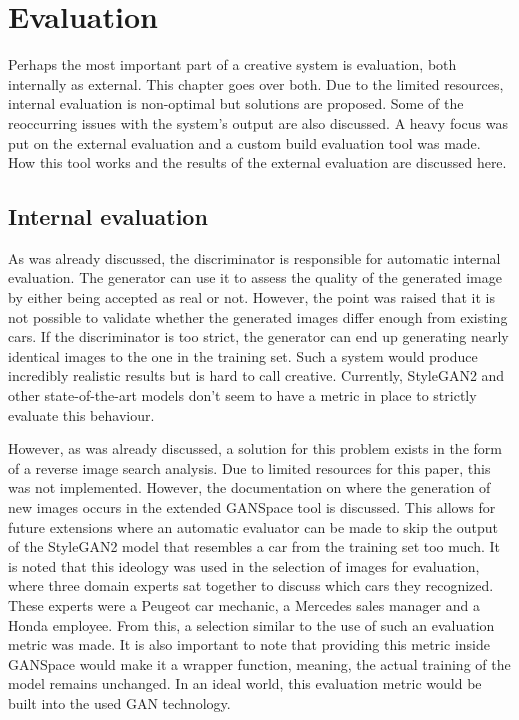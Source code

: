 \chapter{Evaluation}
\label{ch:evaluation}


Perhaps the most important part of a creative system is evaluation, both internally as external.
This chapter goes over both.
Due to the limited resources, internal evaluation is non-optimal but solutions are proposed.
Some of the reoccurring issues with the system's output are also discussed.
A heavy focus was put on the external evaluation and a custom build evaluation tool was made.
How this tool works and the results of the external evaluation are discussed here.

\section{Internal evaluation}
\label{sec:internal_evaluation}

As was already discussed, the discriminator is responsible for automatic internal evaluation.
The generator can use it to assess the quality of the generated image by either being accepted as real or not.
However, the point was raised that it is not possible to validate whether the generated images differ enough from existing cars.
If the discriminator is too strict, the generator can end up generating nearly identical images to the one in the training set.
Such a system would produce incredibly realistic results but is hard to call creative.
Currently, StyleGAN2 and other state-of-the-art models don't seem to have a metric in place to strictly evaluate this behaviour.

However, as was already discussed, a solution for this problem exists in the form of a reverse image search analysis.
Due to limited resources for this paper, this was not implemented.
However, the documentation on where the generation of new images occurs in the extended GANSpace tool is discussed.
This allows for future extensions where an automatic evaluator can be made to skip the output of the StyleGAN2 model that resembles a car from the training set too much.
It is noted that this ideology was used in the selection of images for evaluation, where three domain experts sat together to discuss which cars they recognized.
These experts were a Peugeot car mechanic, a Mercedes sales manager and a Honda employee. 
From this, a selection similar to the use of such an evaluation metric was made.
It is also important to note that providing this metric inside GANSpace would make it a wrapper function, meaning, the actual training of the model remains unchanged.
In an ideal world, this evaluation metric would be built into the used GAN technology.

